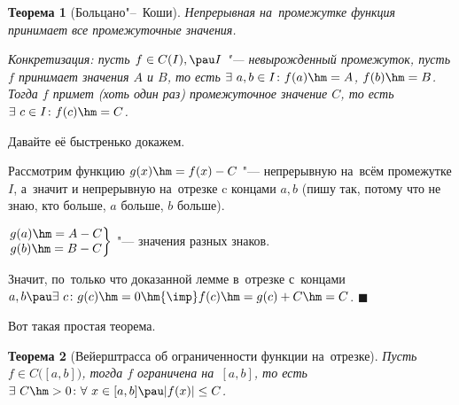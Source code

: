 \documentclass[a4paper,10pt,twoside]{article}
\newtheorem{The}{Теорема}[section]
\newenvironment{Proof}
       {\par\noindent{\textbf{Доказательство.}}}
       {\hfill$\scriptstyle\blacksquare$}
\begin{document}
\begin{The}[Больцано"--~Коши]\label{bk}
Непрерывная на~промежутке функция принимает все промежуточные значения.

Конкретизация: пусть $f\in C(I),\pau I$ "--- невырожденный промежуток, пусть $f$ принимает значения $A$ и $B$, то есть
$\exists\  a,b\in I\colon f(a)\hm=A$, $f(b)\hm=B$. Тогда $f$ примет (хоть один раз) промежуточное значение $C$, то есть $\exists\  c\in I\colon
f(c)\hm=C$.

\end{The}

Давайте её быстренько докажем.
\begin{Proof}
Рассмотрим функцию $g(x)\hm=f(x)-C$ "--- непрерывную на~всём промежутке $I$, а~значит и непрерывную на~отрезке c концами $a,b$ (пишу так, потому что не знаю, кто больше, $a$ больше, $b$ больше).

$\left.\begin{matrix}
g(a)\hm=A-C\\
g(b)\hm=B-C
\end{matrix}\right\}$ "--- значения разных знаков.

Значит, по~только что доказанной лемме в~отрезке с~концами $a,b\pau \exists\  c\colon g(c)\hm=0\hm{\imp} f(c)\hm=g(c)+C\hm=C$.
\end{Proof}

Вот такая простая теорема.

\begin{The}[Вейерштрасса об ограниченности функции на~отрезке]\label{vogr}
Пусть $f\in C\big([a,b]\big)$, тогда $f$ ограничена на~$[a,b]$, то есть $\exists\  C\hm>0\colon \forall\  x\in[a,b]\pau |f(x)|\leq C$.
\end{The}
\end{document}
